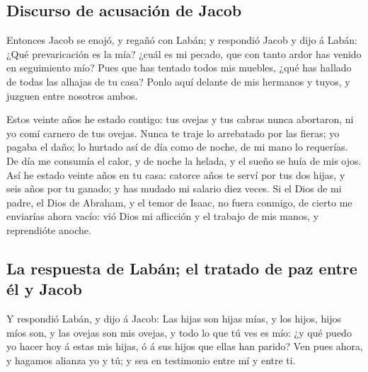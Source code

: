 \hypertarget{discurso-de-acusaciuxf3n-de-jacob}{%
\subsection{Discurso de acusación de
Jacob}\label{discurso-de-acusaciuxf3n-de-jacob}}

 Entonces Jacob se enojó, y regañó con Labán; y respondió
Jacob y dijo á Labán: ¿Qué prevaricación es la mía? ¿cuál es mi pecado,
que con tanto ardor has venido en seguimiento mío?  Pues
que has tentado todos mis muebles, ¿qué has hallado de todas las alhajas
de tu casa? Ponlo aquí delante de mis hermanos y tuyos, y juzguen entre
nosotros ambos.

 Estos veinte años he estado contigo: tus ovejas y tus
cabras nunca abortaron, ni yo comí carnero de tus ovejas.
 Nunca te traje lo arrebatado por las fieras; yo pagaba
el daño; lo hurtado así de día como de noche, de mi mano lo requerías.
 De día me consumía el calor, y de noche la helada, y el
sueño se huía de mis ojos.  Así he estado veinte años en
tu casa: catorce años te serví por tus dos hijas, y seis años por tu
ganado; y has mudado mi salario diez veces.  Si el Dios
de mi padre, el Dios de Abraham, y el temor de Isaac, no fuera conmigo,
de cierto me enviarías ahora vacío: vió Dios mi aflicción y el trabajo
de mis manos, y reprendióte anoche.

\hypertarget{la-respuesta-de-labuxe1n-el-tratado-de-paz-entre-uxe9l-y-jacob}{%
\subsection{La respuesta de Labán; el tratado de paz entre él y
Jacob}\label{la-respuesta-de-labuxe1n-el-tratado-de-paz-entre-uxe9l-y-jacob}}

 Y respondió Labán, y dijo á Jacob: Las hijas son hijas
mías, y los hijos, hijos míos son, y las ovejas son mis ovejas, y todo
lo que tú ves es mío: ¿y qué puedo yo hacer hoy á estas mis hijas, ó á
sus hijos que ellas han parido?  Ven pues ahora, y
hagamos alianza yo y tú; y sea en testimonio entre mí y entre ti.

